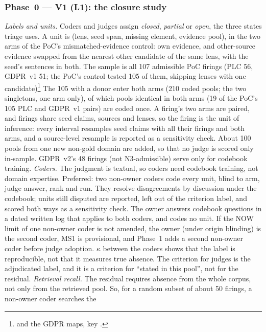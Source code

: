 \subsubsection{Phase~0 --- V1 (L1): the closure study}

\emph{Labels and units.} Coders and judges assign \emph{closed}, \emph{partial} or \emph{open},
the three states triage uses. A unit is (lens, seed span, missing element, evidence pool), in the
two arms of the PoC's mismatched-evidence control: own evidence, and other-source evidence swapped from
the nearest other candidate of the same lens, with the seed's sentences in both. The sample is all 107
admissible PoC firings (PLC 56, GDPR~v1 51; the PoC's control tested 105 of them, skipping lenses with
one candidate)\footnote{ and the GDPR maps, key
.} The 105 with a donor enter both arms (210 coded pools; the two singletons, one arm only), of which pools identical in both
arms (19 of the PoC's 105 PLC and GDPR~v1 pairs) are coded once. A firing's two arms are paired, and firings share seed
claims, sources and lenses, so the firing is the unit of inference: every interval resamples seed
claims with all their firings and both arms, and a source-level resample is reported as a sensitivity
check. About 100 pools from one new non-gold domain are added, so that no judge is scored only
in-sample. GDPR~v2's 48 firings (not N3-admissible) serve only for codebook training.
\emph{Coders.} The judgment is textual, so coders need codebook training, not domain expertise.
Preferred: two non-owner coders code every unit, blind to arm, judge answer, rank and run. They resolve
disagreements by discussion under the codebook; units still disputed are reported, left out of the
criterion label, and scored both ways as a sensitivity check. The owner answers codebook questions in a
dated written log that applies to both coders, and codes no unit. If the NOW limit of one non-owner
coder is not amended, the owner (under origin blinding) is the second coder, MS1 is provisional, and
Phase~1 adds a second non-owner coder before judge adoption. \evint{} $\kappa$ between the coders shows
that the label is reproducible, not that it measures true absence. The criterion for judges is the
adjudicated label, and it is a criterion for \enquote{stated in this pool}, not for the residual.
\emph{Retrieval recall.} \evfut{} The residual requires absence from the whole corpus, not only
from the retrieved pool. So, for a random subset of about 50 firings, a non-owner coder searches the
